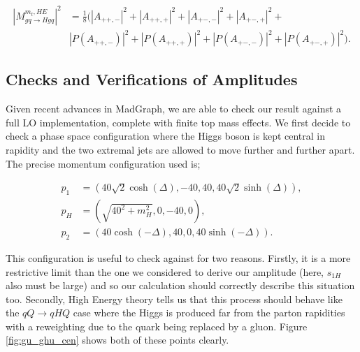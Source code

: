 \begin{equation}
\begin{split}
|M_{gq \to Hgq}^{m_t, HE}|^2 &= \frac{1}{8} \big( |A_{++,-}|^2 + |A_{++,+}|^2 + |A_{+-,-}|^2 + |A_{+-,+}|^2 + \\
&|P(A_{++,-})|^2 + |P(A_{++,+})|^2 + |P(A_{+-,-})|^2 + |P(A_{+-,+})|^2 \big).
\end{split}
\end{equation}

\subsection{Checks and Verifications of Amplitudes}

Given recent advances in MadGraph, we are able to check our result against a full LO implementation, complete with finite top mass effects. We first decide to check a phase space configuration where the Higgs boson is kept central in rapidity and the two extremal jets are allowed to move further and further apart. The precise momentum configuration used is; 

\begin{subequations}
\begin{align}
p_1 &= (40 \sqrt{2} \cosh(\Delta),-40,40,40 \sqrt{2} \sinh(\Delta)), \\
p_H &= (\sqrt{40^2+m_H^2}, 0,-40,0), \\
p_2 &= (40 \cosh(-\Delta),40,0,40 \sinh(-\Delta)).
\end{align}
\end{subequations}

This configuration is useful to check against for two reasons. Firstly, it is a more restrictive limit than the one we considered to derive our amplitude (here, $s_{1H}$ also must be large) and so our calculation should correctly describe this situation too. Secondly, High Energy theory tells us that this process should behave like the $qQ \to qHQ$ case where the Higgs is produced far from the parton rapidities with a reweighting due to the quark being replaced by a gluon. Figure \ref{fig:gu_ghu_cen} shows both of these points clearly. 

